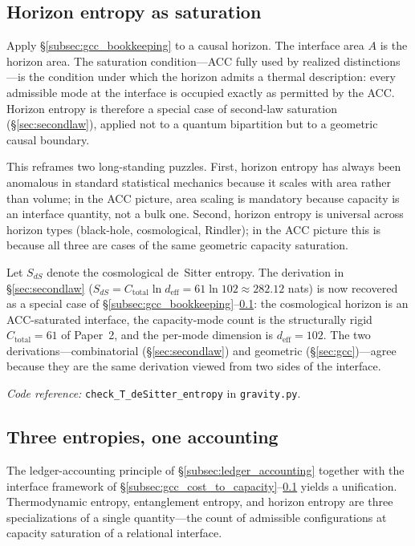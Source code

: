 \documentclass[11pt]{article}
\newcommand{\coderef}[2]{\smallskip\noindent\textit{Code reference:} \texttt{#1} in \texttt{#2}.}
\begin{document}
\subsection{Horizon entropy as saturation}
\label{subsec:gcc_horizon}

Apply \S\ref{subsec:gcc_bookkeeping} to a causal horizon.  The interface
area $A$ is the horizon area.  The saturation condition---ACC fully used by
realized distinctions---is the condition under which the horizon admits a
thermal description: every admissible mode at the interface is occupied
exactly as permitted by the ACC.  Horizon entropy is therefore a special
case of second-law saturation (\S\ref{sec:secondlaw}), applied not to a
quantum bipartition but to a geometric causal boundary.

This reframes two long-standing puzzles.  First, horizon entropy has always
been anomalous in standard statistical mechanics because it scales with
area rather than volume; in the ACC picture, area scaling is mandatory
because capacity is an interface quantity, not a bulk one.  Second, horizon
entropy is universal across horizon types (black-hole, cosmological,
Rindler); in the ACC picture this is because all three are cases of the
same geometric capacity saturation.

Let $S_{dS}$ denote the cosmological de~Sitter entropy.  The derivation in
\S\ref{sec:secondlaw} ($S_{dS} = C_{\mathrm{total}}\ln d_{\mathrm{eff}} =
61\ln 102 \approx 282.12$ nats) is now recovered as a special case of
\S\ref{subsec:gcc_bookkeeping}--\ref{subsec:gcc_horizon}: the cosmological
horizon is an ACC-saturated interface, the capacity-mode count is the
structurally rigid $C_{\mathrm{total}}=61$ of Paper~2, and the per-mode
dimension is $d_{\mathrm{eff}}=102$.  The two derivations---combinatorial
(\S\ref{sec:secondlaw}) and geometric (\S\ref{sec:gcc})---agree because
they are the same derivation viewed from two sides of the interface.

\coderef{check\_T\_deSitter\_entropy}{gravity.py}

\subsection{Three entropies, one accounting}
\label{subsec:gcc_unify}

The ledger-accounting principle of \S\ref{subsec:ledger_accounting} together
with the interface framework of \S\ref{subsec:gcc_cost_to_capacity}--\ref{subsec:gcc_horizon}
yields a unification.  Thermodynamic entropy, entanglement entropy, and
horizon entropy are three specializations of a single quantity---the count
of admissible configurations at capacity saturation of a relational
interface.
\end{document}

